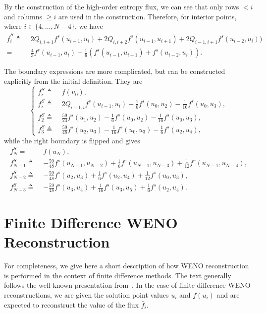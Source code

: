 \documentclass{scrartcl}
\begin{document}
By the construction of the high-order entropy flux, we can see that only
rows $< i$ and columns $\ge i$ are used in the construction. Therefore, for
interior points, where $i \in \{4, \dots, N - 4\}$, we have
\[
\begin{aligned}
\bar{f}^S_i \triangleq\,\, &
2 Q_{i, i + 1} f^s(u_{i - 1}, u_i)
+ 2 Q_{i, i + 2} f^s(u_{i - 1}, u_{i + 1})
+ 2 Q_{i - 1, i + 1} f^s(u_{i - 2}, u_i)) \\
=\,\, &
\frac{4}{3} f^s(u_{i - 1}, u_i)
- \frac{1}{6} (f^s(u_{i - 1}, u_{i + 1}) + f^s(u_{i - 2}, u_i)).
\end{aligned}
\]

The boundary expressions are more complicated, but can be constructed
explicitly from the initial definition. They are
\[
\left\{
\begin{aligned}
f^S_i \triangleq \,\, & f(u_0), \\
f^S_i \triangleq \,\, &
    2 Q_{i - 1, i} f^s(u_{i - 1}, u_i)
    - \frac{1}{6} f^s(u_0, u_2)
    - \frac{1}{16} f^s(u_0, u_3), \\
f^S_2 \triangleq \,\, &
\frac{59}{24} f^s(u_1, u_2)
- \frac{1}{6} f^s(u_0, u_2)
- \frac{1}{16} f^s(u_0, u_3), \\
f^S_3 \triangleq \,\, &
\frac{59}{48} f^s(u_2, u_3)
- \frac{1}{16} f^s(u_0, u_3)
- \frac{1}{6} f^s(u_2, u_4),
\end{aligned}
\right.
\]
while the right boundary is flipped and gives
\[
\begin{aligned}
f^S_N = \,\, & f(u_N), \\
f^S_{N - 1} \triangleq \,\, &
    -\frac{59}{48} f^s(u_{N - 1}, u_{N - 2})
    + \frac{1}{6} f^s(u_{N - 1}, u_{N - 3})
    + \frac{1}{12} f^s(u_{N - 1}, u_{N - 4}), \\
f^S_{N - 2} \triangleq \,\, &
    -\frac{59}{48} f^s(u_2, u_3)
    + \frac{1}{6} f^s(u_2, u_4)
    + \frac{1}{12} f^s(u_0, u_3), \\
f^S_{N - 3} \triangleq \,\, &
    -\frac{59}{48} f^s(u_3, u_4)
    + \frac{1}{16} f^s(u_3, u_5)
    + \frac{1}{6} f^s(u_2, u_4).
\end{aligned}
\]


\appendix
\section{Finite Difference WENO Reconstruction} %
\label{ax:weno}

For completeness, we give here a short description of how WENO reconstruction is
performed in the context of finite difference methods. The text generally
follows the well-known presentation from~\cite{Shu2009}. In the case of finite
difference WENO reconstructions, we are given the solution point values $u_i$ and
$f(u_i)$ and are expected to reconstruct the value of the flux $\bar{f}_i$.
\end{document}
